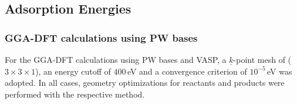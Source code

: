 \documentclass[11pt,DIV=13,BCOR=5mm,a4paper,headinclude]{scrbook}
\renewcommand{\vec}[1]{\underline{#1}}
\begin{document}

\subsection{Adsorption Energies}\label{sec:eads_crystal}
 \subsubsection{GGA-DFT calculations using PW bases}
For the GGA-DFT calculations using PW bases and VASP, a $\vec{k}$-point mesh of ($3\times 3\times 1$), an energy cutoff of $400\,$eV and a convergence criterion of $10^{-5}\,$eV was adopted.
In all cases, geometry optimizations for reactants and products were performed with the respective method.
\end{document}
